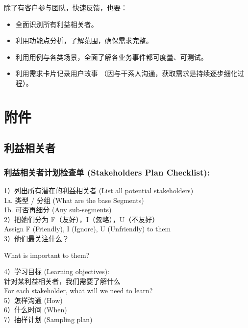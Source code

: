 除了有客户参与团队，快速反馈，也要：

\begin{itemize}
\tightlist
\item
  全面识别所有利益相关者。
\item
  利用功能点分析，了解范围，确保需求完整。
\item
  利用用例与各类场景，全面了解各业务事件都可度量、可测试。
\item
  利用需求卡片记录用户故事
  （因与干系人沟通，获取需求是持续逐步细化过程）。
\end{itemize}

\hypertarget{ux9644ux4ef6}{%
\section{附件}\label{ux9644ux4ef6}}

\hypertarget{ux5229ux76caux76f8ux5173ux8005}{%
\subsection{利益相关者}\label{ux5229ux76caux76f8ux5173ux8005}}

\hypertarget{ux5229ux76caux76f8ux5173ux8005ux8ba1ux5212ux68c0ux67e5ux5355-stakeholders-plan-checklist}{%
\subsubsection{利益相关者计划检查单 (Stakeholders Plan
Checklist):}\label{ux5229ux76caux76f8ux5173ux8005ux8ba1ux5212ux68c0ux67e5ux5355-stakeholders-plan-checklist}}

1）列出所有潜在的利益相关者 (List all potential stakeholders)\\
1a. 类型 / 分组 (What are the base Segments)\\
1b. 可否再细分 (Any sub-segments)\\	
2）把她们分为 F（友好），I（忽略），U（不友好）\\
Assign F (Friendly), I (Ignore), U (Unfriendly) to them\\
3）他们最关注什么？

\begin{description}
\tightlist
\item[]
What is important to them?\\
\end{description}

4）学习目标 (Learning objectives):\\
针对某利益相关者，我们需要了解什么\\
For each stakeholder, what will we need to learn?\\	
5）怎样沟通 (How)\\
6）什么时间 (When)\\
7）抽样计划 (Sampling plan)

